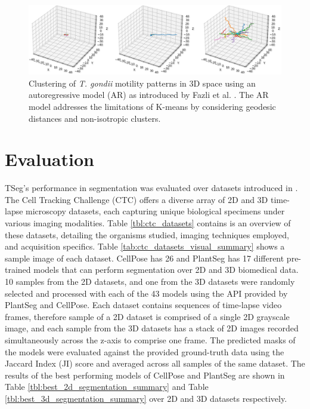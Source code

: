 \documentclass[./dissertation.tex]{subfiles}
\begin{document}
\begin{figure}[h]
    \centering\includegraphics[width=.9\textwidth]{figures/tseg/clusters plot.png}
    \caption{Clustering of \textit{\textit{T. gondii}} motility patterns in 3D space using an autoregressive model (AR) as introduced by Fazli et al. \cite{fazli2019lightweight}. The AR model addresses the limitations of K-means by considering geodesic distances and non-isotropic clusters.}
    \label{fig:clustering}
\end{figure}




\section{Evaluation}
TSeg's performance in segmentation was evaluated over datasets introduced in \cite{mavska2023cell}. The Cell Tracking Challenge (CTC) offers a diverse array of 2D and 3D time-lapse microscopy datasets, each capturing unique biological specimens under various imaging modalities. Table \ref{tbl:ctc_datasets} contains is an overview of these datasets, detailing the organisms studied, imaging techniques employed, and acquisition specifics. Table \ref{tab:ctc_datasets_visual_summary} shows a sample image of each dataset. CellPose has 26 and PlantSeg has 17 different pre-trained models that can perform segmentation over 2D and 3D biomedical data. 10 samples from the 2D datasets, and one from the 3D datasets were randomly selected and processed with each of the 43 models using the API provided by PlantSeg and CellPose. Each dataset contains sequences of time-lapse video frames, therefore sample of a 2D dataset is comprised of a single 2D grayscale image, and each sample from the 3D datasets has a stack of 2D images recorded simultaneously across the z-axis to comprise one frame. The predicted masks of the models were evaluated against the provided ground-truth data using the Jaccard Index (JI) score and averaged across all samples of the same dataset. The results of the best performing models of CellPose and PlantSeg are shown in Table \ref{tbl:best_2d_segmentation_summary} and Table \ref{tbl:best_3d_segmentation_summary} over 2D and 3D datasets respectively.
\end{document}
